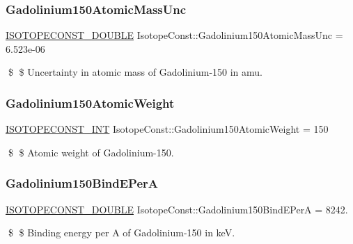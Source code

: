 \subsubsection{\texorpdfstring{Gadolinium150\+Atomic\+Mass\+Unc}{Gadolinium150AtomicMassUnc}}
{\footnotesize\ttfamily \mbox{\hyperlink{group___isotope_const-_macros_ga8f45a7272ce02c0b4c65c44636ed719a}{I\+S\+O\+T\+O\+P\+E\+C\+O\+N\+S\+T\+\_\+\+D\+O\+U\+B\+LE}} Isotope\+Const\+::\+Gadolinium150\+Atomic\+Mass\+Unc = 6.\+523e-\/06}

\$ \$ Uncertainty in atomic mass of Gadolinium-\/150 in amu. \mbox{\label{group___isotope_const-_gadolinium-_gd150_gaede79bebad4f95819f58705584b88fb0}} 
\subsubsection{\texorpdfstring{Gadolinium150\+Atomic\+Weight}{Gadolinium150AtomicWeight}}
{\footnotesize\ttfamily \mbox{\hyperlink{group___isotope_const-_macros_ga5f18360b3e99483a35c32d789e62621c}{I\+S\+O\+T\+O\+P\+E\+C\+O\+N\+S\+T\+\_\+\+I\+NT}} Isotope\+Const\+::\+Gadolinium150\+Atomic\+Weight = 150}

\$ \$ Atomic weight of Gadolinium-\/150. \mbox{\label{group___isotope_const-_gadolinium-_gd150_ga14cd5354d38a209c1abfa74ce0e9b503}} 
\subsubsection{\texorpdfstring{Gadolinium150\+Bind\+E\+PerA}{Gadolinium150BindEPerA}}
{\footnotesize\ttfamily \mbox{\hyperlink{group___isotope_const-_macros_ga8f45a7272ce02c0b4c65c44636ed719a}{I\+S\+O\+T\+O\+P\+E\+C\+O\+N\+S\+T\+\_\+\+D\+O\+U\+B\+LE}} Isotope\+Const\+::\+Gadolinium150\+Bind\+E\+PerA = 8242.}

\$ \$ Binding energy per A of Gadolinium-\/150 in keV. \mbox{\label{group___isotope_const-_gadolinium-_gd150_ga7e00c8fac7cc9ac83643278d1919e8dc}} 

